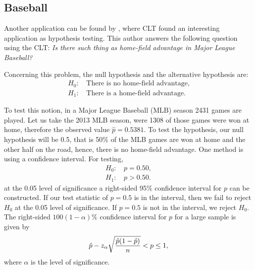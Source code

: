 \documentclass[10pt,leter,openany]{article}
\begin{document}
		\subsection{Baseball}
		
		Another application can be found by \citet{anderson2014central}, where CLT found an interesting application as hypothesis testing. This author answers the following question using the CLT: \textit{Is there such thing as home-field advantage in Major League Baseball?}
		
		Concerning this problem, the null hypothesis and the alternative hypothesis are: \begin{equation*}
				\begin{aligned}
					H_{0}\mbox{: }& \mbox{There is no home-field advantage},\\
					H_{1}\mbox{: }& \mbox{There is a home-field advantage}.
				\end{aligned}
			\end{equation*}
		
		To test this notion, in a Major League Baseball (MLB) season 2431 games are played. Let us take the 2013 MLB season, were 1308 of those games were won at home, therefore the observed value $\hat{p}=0.5381$. To test the hypothesis, our null hypothesis will be 0.5, that is 50\% of the MLB games are won at home and the other half on the road, hence, there is no home-field advantage. One method is using a confidence interval. For testing, \begin{equation*}
			\begin{aligned}
				H_{0}\mbox{: }& p=0.50,\\
				H_{1}\mbox{: }& p>0.50.
			\end{aligned}
		\end{equation*} at the 0.05 level of significance a right-sided 95\% confidence interval for $p$ can be constructed. If our test statistic of $ p=0.5 $ is in the interval, then we fail to reject $H_{0}$ at the 0.05 level of significance. If $p=0.5$ is not in the interval, we reject $H_{0}$. The right-sided $100(1-\alpha)\%$ confidence interval for $p$ for a large sample is given by \begin{equation*}
			\hat{p} - z_{\alpha} \sqrt{\dfrac{\hat{p}(1-\hat{p})}{n}} < p \leq 1\\,
		\end{equation*} where $\alpha$ is the level of significance.
	
\end{document}
